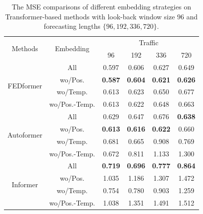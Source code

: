 \begin{table}[h]
    \centering
    \scalebox{0.85}
    {
            \begin{tabular}{c|c|cccc}
            \hline
            \multirow{2}{*}{Methods}    & \multirow{2}{*}{Embedding}                & \multicolumn{4}{c}{Traffic}                                   \\
                                         &                            & 96             & 192            & 336            & 720            \\\hline \hline
            \multirow{4}{*}{FEDformer}   & All                       & 0.597          & 0.606          & 0.627          & 0.649          \\
                                         & wo/Pos.                   & \textbf{0.587} & \textbf{0.604} & \textbf{0.621} & \textbf{0.626} \\
                                         & wo/Temp.                  & 0.613          & 0.623          & 0.650          & 0.677          \\
                                         & wo/Pos.-Temp.             & 0.613          & 0.622          & 0.648          & 0.663          \\\hline\hline
            \multirow{4}{*}{Autoformer}  & All              & 0.629          & 0.647          & 0.676          & \textbf{0.638} \\
                                         & wo/Pos.          & \textbf{0.613} & \textbf{0.616} & \textbf{0.622} & 0.660          \\
                                         & wo/Temp.         & 0.681          & 0.665          & 0.908          & 0.769          \\
                                         & wo/Pos.-Temp.    & 0.672          & 0.811          & 1.133          & 1.300          \\\hline\hline
            \multirow{4}{*}{Informer}    & All              & \textbf{0.719} & \textbf{0.696} & \textbf{0.777} & \textbf{0.864}          \\
                                         & wo/Pos.          & 1.035          & 1.186          & 1.307          & 1.472          \\
                                         & wo/Temp.         & 0.754          & 0.780          & 0.903          & 1.259 \\
                                         & wo/Pos.-Temp.    & 1.038          & 1.351          & 1.491          & 1.512         
             \\\hline
            \end{tabular}
            }
            \vspace{-0.3cm}
            \caption{The MSE comparisons of different embedding strategies on Transformer-based methods with look-back window size $96$ and forecasting lengths $\{96,192,336,720\}$. }
\label{tab:embedding}
\vspace{-0.5cm}
\end{table}      
            
